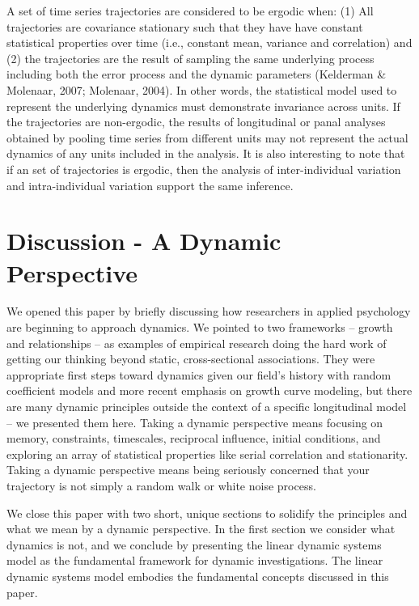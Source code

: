 \documentclass[english,,man]{apa6}
\theoremstyle{definition}
\theoremstyle{definition}
\theoremstyle{definition}
\theoremstyle{remark}
\begin{document}
A set of time series trajectories are considered to be ergodic when: (1)
All trajectories are covariance stationary such that they have have
constant statistical properties over time (i.e., constant mean, variance
and correlation) and (2) the trajectories are the result of sampling the
same underlying process including both the error process and the dynamic
parameters (Kelderman \& Molenaar, 2007; Molenaar, 2004). In other
words, the statistical model used to represent the underlying dynamics
must demonstrate invariance across units. If the trajectories are
non-ergodic, the results of longitudinal or panal analyses obtained by
pooling time series from different units may not represent the actual
dynamics of any units included in the analysis. It is also interesting
to note that if an set of trajectories is ergodic, then the analysis of
inter-individual variation and intra-individual variation support the
same inference.

\hypertarget{discussion---a-dynamic-perspective}{%
\section{Discussion - A Dynamic
Perspective}\label{discussion---a-dynamic-perspective}}

We opened this paper by briefly discussing how researchers in applied
psychology are beginning to approach dynamics. We pointed to two
frameworks -- growth and relationships -- as examples of empirical
research doing the hard work of getting our thinking beyond static,
cross-sectional associations. They were appropriate first steps toward
dynamics given our field's history with random coefficient models and
more recent emphasis on growth curve modeling, but there are many
dynamic principles outside the context of a specific longitudinal model
-- we presented them here. Taking a dynamic perspective means focusing
on memory, constraints, timescales, reciprocal influence, initial
conditions, and exploring an array of statistical properties like serial
correlation and stationarity. Taking a dynamic perspective means being
seriously concerned that your trajectory is not simply a random walk or
white noise process.

We close this paper with two short, unique sections to solidify the
principles and what we mean by a dynamic perspective. In the first
section we consider what dynamics is not, and we conclude by presenting
the linear dynamic systems model as the fundamental framework for
dynamic investigations. The linear dynamic systems model embodies the
fundamental concepts discussed in this paper.
\end{document}

